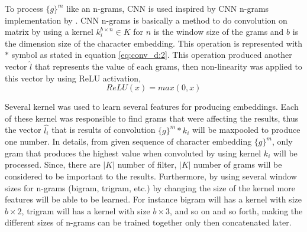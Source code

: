        To process $\{g\}^m$ like an n-grams, CNN is used inspired
        by CNN n-grams implementation by \cite{convolutional2014kim}.
        CNN n-grams is basically a method to do convolution on matrix
        by using a kernel $k_i^{b \times n} \in K$ for $n$ is the
        window size of the grams and $b$ is the dimension size of the
        character embedding. This operation is represented with $*$
        symbol as stated in equation \ref{eq:conv_d:2}. This operation
        produced another vector $\hat{l}$ that represents the value of
        each grams, then non-linearity was applied to this vector by
        using ReLU activation,
        \begin{equation}
            \label{eq:relu}
            ReLU(x) = max(0,x)
        \end{equation}

        Several kernel was used to learn several features for
        producing embeddings. Each of these kernel was responsible to
        find grams that were affecting the results, thus the vector
        $\hat{l_i}$ that is results of convolution $\{g\}^m * k_i$
        will be maxpooled to produce one number. In details, from
        given sequence of character embedding $\{g\}^m$, only gram
        that produces the highest value when convoluted by using
        kernel $k_i$ will be processed. Since, there are $\vert K
        \vert$ number of filter, $\vert K \vert$ number of grams will
        be considered to be important to the results. Furthermore, by
        using several window sizes for n-grams (bigram, trigram, etc.)
        by changing the size of the kernel more features will be able
        to be learned. For instance bigram will has a kernel with size
        $b \times 2$, trigram will has a kernel with size $b \times
        3$, and so on and so forth, making the different sizes of
        n-grams can be trained together only then concatenated later.

